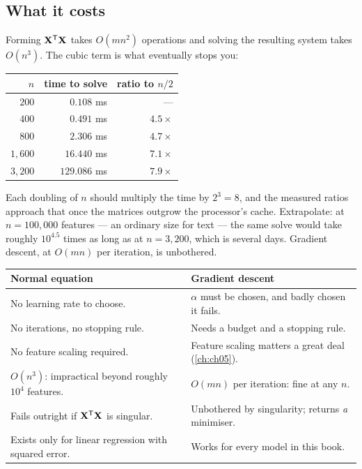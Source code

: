 \subsection{What it costs}

Forming $\mathbf{X}^{\mathsf{T}}\mathbf{X}$ takes $O(mn^2)$ operations and solving the
resulting system takes $O(n^3)$. The cubic term is what eventually stops you:

\begin{center}
\small
\renewcommand{\arraystretch}{1.15}
\begin{tabular}{@{}rrr@{}}
\toprule
$n$ & time to solve & ratio to $n/2$\\
\midrule
$200$   & $0.108$ ms   & ---\\
$400$   & $0.491$ ms   & $4.5\times$\\
$800$   & $2.306$ ms   & $4.7\times$\\
$1{,}600$ & $16.440$ ms & $7.1\times$\\
$3{,}200$ & $129.086$ ms & $7.9\times$\\
\bottomrule
\end{tabular}
\end{center}

Each doubling of $n$ should multiply the time by $2^3 = 8$, and the measured
ratios approach that once the matrices outgrow the processor's cache. Extrapolate:
at $n = 100{,}000$ features --- an ordinary size for text --- the same solve would
take roughly $10^{4.5}$ times as long as at $n=3{,}200$, which is several days.
Gradient descent, at $O(mn)$ per iteration, is unbothered.

\begin{center}
\small
\renewcommand{\arraystretch}{1.25}
\begin{tabular}{@{}L{5.1cm}L{5.1cm}@{}}
\toprule
\textbf{Normal equation} & \textbf{Gradient descent}\\
\midrule
No learning rate to choose. & $\alpha$ must be chosen, and badly chosen it
  fails.\\
No iterations, no stopping rule. & Needs a budget and a stopping rule.\\
No feature scaling required. & Feature scaling matters a great deal
  (\cref{ch:ch05}).\\
$O(n^3)$: impractical beyond roughly $10^4$ features. & $O(mn)$ per iteration:
  fine at any $n$.\\
Fails outright if $\mathbf{X}^{\mathsf{T}}\mathbf{X}$ is singular. & Unbothered by
  singularity; returns \emph{a} minimiser.\\
Exists only for linear regression with squared error. & Works for every model in
  this book.\\
\bottomrule
\end{tabular}
\end{center}

